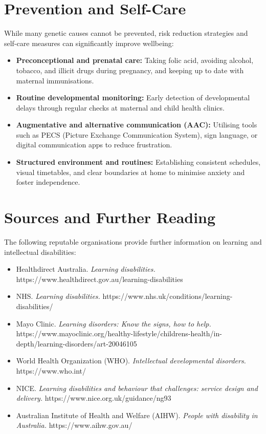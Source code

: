 \section*{Prevention and Self-Care}
While many genetic causes cannot be prevented, risk reduction strategies and self-care measures can significantly improve wellbeing:
\begin{itemize}
    \item \textbf{Preconceptional and prenatal care:} Taking folic acid, avoiding alcohol, tobacco, and illicit drugs during pregnancy, and keeping up to date with maternal immunisations.
    \item \textbf{Routine developmental monitoring:} Early detection of developmental delays through regular checks at maternal and child health clinics.
    \item \textbf{Augmentative and alternative communication (AAC):} Utilising tools such as PECS (Picture Exchange Communication System), sign language, or digital communication apps to reduce frustration.
    \item \textbf{Structured environment and routines:} Establishing consistent schedules, visual timetables, and clear boundaries at home to minimise anxiety and foster independence.
\end{itemize}

\section*{Sources and Further Reading}
The following reputable organisations provide further information on learning and intellectual disabilities:
\begin{itemize}
    \item Healthdirect Australia. \textit{Learning disabilities.} https://www.healthdirect.gov.au/learning-disabilities
    \item NHS. \textit{Learning disabilities.} https://www.nhs.uk/conditions/learning-disabilities/
    \item Mayo Clinic. \textit{Learning disorders: Know the signs, how to help.} https://www.mayoclinic.org/healthy-lifestyle/childrens-health/in-depth/learning-disorders/art-20046105
    \item World Health Organization (WHO). \textit{Intellectual developmental disorders.} https://www.who.int/
    \item NICE. \textit{Learning disabilities and behaviour that challenges: service design and delivery.} https://www.nice.org.uk/guidance/ng93
    \item Australian Institute of Health and Welfare (AIHW). \textit{People with disability in Australia.} https://www.aihw.gov.au/
\end{itemize}
